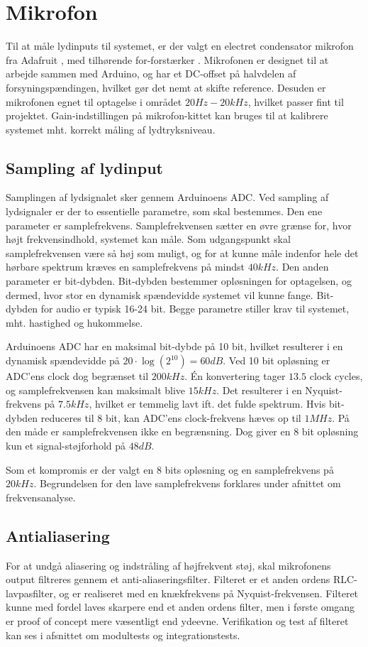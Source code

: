 \section{Mikrofon}
Til at måle lydinputs til systemet, er der valgt en electret condensator mikrofon fra Adafruit \cite{manual_mic}, med tilhørende for-forstærker \cite{manual_amp}. 
Mikrofonen er designet til at arbejde sammen med Arduino, og har et DC-offset på halvdelen af forsyningspændingen, hvilket gør det nemt at skifte reference. 
Desuden er mikrofonen egnet til optagelse i området $20 Hz - 20 kHz$, hvilket passer fint til projektet. 
Gain-indstillingen på mikrofon-kittet kan bruges til at kalibrere systemet mht. korrekt måling af lydtryksniveau. 

\subsection{Sampling af lydinput}
Samplingen af lydsignalet sker gennem Arduinoens ADC. 
Ved sampling af lydsignaler er der to essentielle parametre, som skal bestemmes.
Den ene parameter er samplefrekvens. 
Samplefrekvensen sætter en øvre grænse for, hvor højt frekvensindhold, systemet kan måle. 
Som udgangspunkt skal samplefrekvensen være så høj som muligt, og for at kunne måle indenfor hele det hørbare spektrum kræves en samplefrekvens på mindst $40 kHz$. 
Den anden parameter er bit-dybden.
Bit-dybden bestemmer opløsningen for optagelsen, og dermed, hvor stor en dynamisk spændevidde systemet vil kunne fange. 
Bit-dybden for audio er typisk 16-24 bit. 
Begge parametre stiller krav til systemet, mht. hastighed og hukommelse. 

Arduinoens ADC har en maksimal bit-dybde på 10 bit, hvilket resulterer i en dynamisk spændevidde på $ 20 \cdot \log (2^{10}) = 60 dB$. 
Ved 10 bit opløsning er ADC'ens clock dog begrænset til $200 kHz$. 
Én konvertering tager $13.5$ clock cycles, og samplefrekvensen kan maksimalt blive $ 15 kHz$.
Det resulterer i en Nyquist-frekvens på $7.5 kHz$, hvilket er temmelig lavt ift. det fulde spektrum. 
Hvis bit-dybden reduceres til 8 bit, kan ADC'ens clock-frekvens hæves op til $1 MHz$. 
På den måde er samplefrekvensen ikke en begrænsning. 
Dog giver en 8 bit opløsning kun et signal-støjforhold på $48 dB$. 

Som et kompromis er der valgt en 8 bits opløsning og en samplefrekvens på $20 kHz$.
Begrundelsen for den lave samplefrekvens forklares under afnittet om frekvensanalyse. 

\subsection{Antialiasering}
For at undgå aliasering og indstråling af højfrekvent støj, skal mikrofonens output filtreres gennem et anti-aliaseringsfilter.
Filteret er et anden ordens RLC-lavpasfilter, og er realiseret med en knækfrekvens på Nyquist-frekvensen. 
Filteret kunne med fordel laves skarpere end et anden ordens filter, men i første omgang er proof of concept mere væsentligt end ydeevne. 
Verifikation og test af filteret kan ses i afsnittet om modultests og integrationstests.

